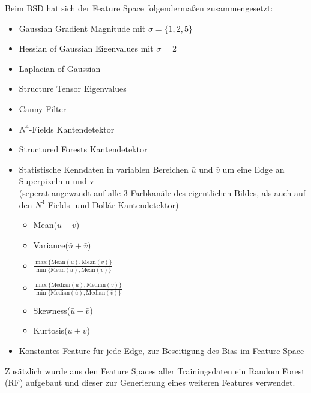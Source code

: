 Beim BSD hat sich der Feature Space folgendermaßen zusammengesetzt:

\begin{itemize}
	\item Gaussian Gradient Magnitude mit $\sigma=\{1, 2, 5\}$
	\item Hessian of Gaussian Eigenvalues mit $\sigma=2$
	\item Laplacian of Gaussian
	\item Structure Tensor Eigenvalues
	\item Canny Filter
	\item $N^4$-Fields Kantendetektor \cite{n4}
	\item Structured Forests Kantendetektor \cite[Dollár et al.]{dollar}
	\item Statistische Kenndaten in variablen Bereichen $\bar{u}$ und $\bar{v}$ um eine Edge an Superpixeln u und v \\
	(seperat angewandt auf alle 3 Farbkanäle des eigentlichen Bildes, als auch auf den $N^4$-Fields- und Dollár-Kantendetektor)
	\begin{itemize}
		\item Mean($\bar{u} + \bar{v}$)
		\item Variance($\bar{u} + \bar{v}$)
		\item $\frac{\max{\{\text{Mean}(\bar{u}), \text{Mean}(\bar{v}) \}}}{\min{\{\text{Mean}(\bar{u}), \text{Mean}(\bar{v})}\}}$
		\item $\frac{\max{\{\text{Median}(\bar{u}), \text{Median}(\bar{v}) \}}}{\min{\{\text{Median}(\bar{u}), \text{Median}(\bar{v})}\}}$
		\item Skewness($\bar{u} + \bar{v}$)
		\item Kurtosis($\bar{u} + \bar{v}$)
	\end{itemize}
	\item Konstantes Feature für jede Edge, zur Beseitigung des Bias im Feature Space
\end{itemize}

Zusätzlich wurde aus den Feature Spaces aller Trainingsdaten ein Random Forest (RF) aufgebaut und dieser zur Generierung eines weiteren Features verwendet.







